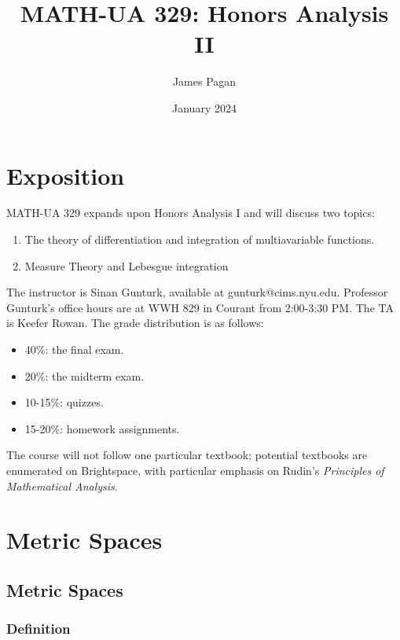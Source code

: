 \documentclass[11pt]{article}
\title{MATH-UA 329: Honors Analysis II}
\author{James Pagan}
\date{January 2024}
\begin{document}
\maketitle
\tableofcontents
\newpage


\section{Exposition}

MATH-UA 329 expands upon Honors Analysis I and will discuss two topics:
\begin{enumerate}
	\item The theory of differentiation and integration of multiavariable functions.
	\item Measure Theory and Lebesgue integration
\end{enumerate}
The instructor is Sinan Gunturk, available at gunturk@cims.nyu.edu. Professor Gunturk's office hours are at WWH 829 in Courant from 2:00-3:30 PM. The TA is Keefer Rowan. The grade distribution is as follows:
\begin{itemize}
	\item 40\%: the final exam.
	\item 20\%: the midterm exam.
	\item 10-15\%: quizzes.
	\item 15-20\%: homework assignments.
\end{itemize}
The course will not follow one particular textbook; potential textbooks are enumerated on Brightspace, with particular emphasis on Rudin's \textit{Principles of Mathematical Analysis}.


\section{Metric Spaces}


\subsection{Metric Spaces}


\subsubsection*{Definition}
\end{document}
